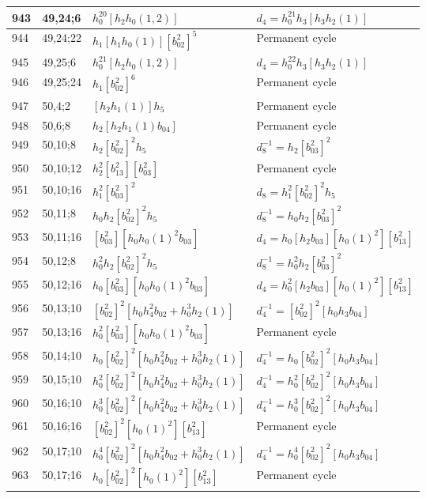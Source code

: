 \documentclass{article}
\begin{document}
\begin{longtable}{|l|l|>{\raggedright\arraybackslash}p{6cm}|>{\raggedright\arraybackslash}p{6cm}|}
\hline
943 & 49,24;6 & $h_0^{20}[h_2h_0(1, 2)]$ &$d_{4}=h_0^{21}h_3[h_3h_2(1)]$\\
\hline
944 & 49,24;22 & $h_1[h_1h_0(1)][b_{02}^2]^5$ & Permanent cycle\\
\hline
945 & 49,25;6 & $h_0^{21}[h_2h_0(1, 2)]$ &$d_{4}=h_0^{22}h_3[h_3h_2(1)]$\\
\hline
946 & 49,25;24 & $h_1[b_{02}^2]^6$ & Permanent cycle\\
\hline
947 & 50,4;2 & $[h_2h_1(1)]h_5$ & Permanent cycle\\
\hline
948 & 50,6;8 & $h_2[h_2h_1(1)b_{04}]$ & Permanent cycle\\
\hline
949 & 50,10;8 & $h_2[b_{02}^2]^2h_5$ & $d_{8}^{-1}=h_2[b_{03}^2]^2$\\
\hline
950 & 50,10;12 & $h_2^2[b_{13}^2][b_{03}^2]$ & Permanent cycle\\
\hline
951 & 50,10;16 & $h_1^2[b_{03}^2]^2$ &$d_{8}=h_1^2[b_{02}^2]^2h_5$\\
\hline
952 & 50,11;8 & $h_0h_2[b_{02}^2]^2h_5$ & $d_{8}^{-1}=h_0h_2[b_{03}^2]^2$\\
\hline
953 & 50,11;16 & $[b_{03}^2][h_0h_0(1)^2b_{03}]$ &$d_{4}=h_0[h_2b_{03}][h_0(1)^2][b_{13}^2]$\\
\hline
954 & 50,12;8 & $h_0^2h_2[b_{02}^2]^2h_5$ & $d_{8}^{-1}=h_0^2h_2[b_{03}^2]^2$\\
\hline
955 & 50,12;16 & $h_0[b_{03}^2][h_0h_0(1)^2b_{03}]$ &$d_{4}=h_0^2[h_2b_{03}][h_0(1)^2][b_{13}^2]$\\
\hline
956 & 50,13;10 & $[b_{02}^2]^2[h_0h_4^2b_{02} + h_0^3h_2(1)]$ & $d_{4}^{-1}=[b_{02}^2]^2[h_0h_3b_{04}]$\\
\hline
957 & 50,13;16 & $h_0^2[b_{03}^2][h_0h_0(1)^2b_{03}]$ & Permanent cycle\\
\hline
958 & 50,14;10 & $h_0[b_{02}^2]^2[h_0h_4^2b_{02} + h_0^3h_2(1)]$ & $d_{4}^{-1}=h_0[b_{02}^2]^2[h_0h_3b_{04}]$\\
\hline
959 & 50,15;10 & $h_0^2[b_{02}^2]^2[h_0h_4^2b_{02} + h_0^3h_2(1)]$ & $d_{4}^{-1}=h_0^2[b_{02}^2]^2[h_0h_3b_{04}]$\\
\hline
960 & 50,16;10 & $h_0^3[b_{02}^2]^2[h_0h_4^2b_{02} + h_0^3h_2(1)]$ & $d_{4}^{-1}=h_0^3[b_{02}^2]^2[h_0h_3b_{04}]$\\
\hline
961 & 50,16;16 & $[b_{02}^2]^2[h_0(1)^2][b_{13}^2]$ & Permanent cycle\\
\hline
962 & 50,17;10 & $h_0^4[b_{02}^2]^2[h_0h_4^2b_{02} + h_0^3h_2(1)]$ & $d_{4}^{-1}=h_0^4[b_{02}^2]^2[h_0h_3b_{04}]$\\
\hline
963 & 50,17;16 & $h_0[b_{02}^2]^2[h_0(1)^2][b_{13}^2]$ & Permanent cycle\\

\end{longtable}
\end{document}
